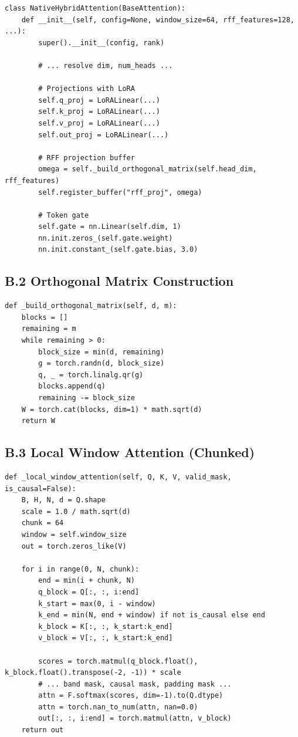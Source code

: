 \begin{lstlisting}
class NativeHybridAttention(BaseAttention):
    def __init__(self, config=None, window_size=64, rff_features=128, ...):
        super().__init__(config, rank)
        
        # ... resolve dim, num_heads ...
        
        # Projections with LoRA
        self.q_proj = LoRALinear(...)
        self.k_proj = LoRALinear(...)
        self.v_proj = LoRALinear(...)
        self.out_proj = LoRALinear(...)
        
        # RFF projection buffer
        omega = self._build_orthogonal_matrix(self.head_dim, rff_features)
        self.register_buffer("rff_proj", omega)
        
        # Token gate
        self.gate = nn.Linear(self.dim, 1)
        nn.init.zeros_(self.gate.weight)
        nn.init.constant_(self.gate.bias, 3.0)
\end{lstlisting}

\subsection{B.2 Orthogonal Matrix Construction}

\begin{lstlisting}
def _build_orthogonal_matrix(self, d, m):
    blocks = []
    remaining = m
    while remaining > 0:
        block_size = min(d, remaining)
        g = torch.randn(d, block_size)
        q, _ = torch.linalg.qr(g)
        blocks.append(q)
        remaining -= block_size
    W = torch.cat(blocks, dim=1) * math.sqrt(d)
    return W
\end{lstlisting}

\subsection{B.3 Local Window Attention (Chunked)}

\begin{lstlisting}
def _local_window_attention(self, Q, K, V, valid_mask, is_causal=False):
    B, H, N, d = Q.shape
    scale = 1.0 / math.sqrt(d)
    chunk = 64
    window = self.window_size
    out = torch.zeros_like(V)
    
    for i in range(0, N, chunk):
        end = min(i + chunk, N)
        q_block = Q[:, :, i:end]
        k_start = max(0, i - window)
        k_end = min(N, end + window) if not is_causal else end
        k_block = K[:, :, k_start:k_end]
        v_block = V[:, :, k_start:k_end]
        
        scores = torch.matmul(q_block.float(), k_block.float().transpose(-2, -1)) * scale
        # ... band mask, causal mask, padding mask ...
        attn = F.softmax(scores, dim=-1).to(Q.dtype)
        attn = torch.nan_to_num(attn, nan=0.0)
        out[:, :, i:end] = torch.matmul(attn, v_block)
    return out
\end{lstlisting}

